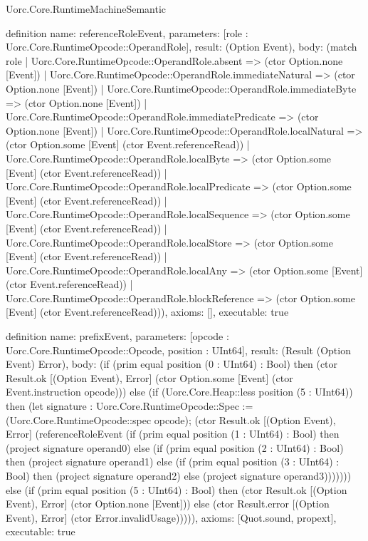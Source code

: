 \begin{lexlean}{Uorc.Core.RuntimeMachineSemantic}
\begin{semanticmodule}
definition{
  name: referenceRoleEvent,
  parameters: [role : Uorc.Core.RuntimeOpcode::OperandRole],
  result: (Option Event),
  body: (match role
    | Uorc.Core.RuntimeOpcode::OperandRole.absent => (ctor Option.none [Event])
    | Uorc.Core.RuntimeOpcode::OperandRole.immediateNatural => (ctor Option.none [Event])
    | Uorc.Core.RuntimeOpcode::OperandRole.immediateByte => (ctor Option.none [Event])
    | Uorc.Core.RuntimeOpcode::OperandRole.immediatePredicate => (ctor Option.none [Event])
    | Uorc.Core.RuntimeOpcode::OperandRole.localNatural => (ctor Option.some [Event] (ctor Event.referenceRead))
    | Uorc.Core.RuntimeOpcode::OperandRole.localByte => (ctor Option.some [Event] (ctor Event.referenceRead))
    | Uorc.Core.RuntimeOpcode::OperandRole.localPredicate => (ctor Option.some [Event] (ctor Event.referenceRead))
    | Uorc.Core.RuntimeOpcode::OperandRole.localSequence => (ctor Option.some [Event] (ctor Event.referenceRead))
    | Uorc.Core.RuntimeOpcode::OperandRole.localStore => (ctor Option.some [Event] (ctor Event.referenceRead))
    | Uorc.Core.RuntimeOpcode::OperandRole.localAny => (ctor Option.some [Event] (ctor Event.referenceRead))
    | Uorc.Core.RuntimeOpcode::OperandRole.blockReference => (ctor Option.some [Event] (ctor Event.referenceRead))),
  axioms: [],
  executable: true
}

definition{
  name: prefixEvent,
  parameters: [opcode : Uorc.Core.RuntimeOpcode::Opcode, position : UInt64],
  result: (Result (Option Event) Error),
  body: (if (prim equal position (0 : UInt64) : Bool) then (ctor Result.ok [(Option Event), Error] (ctor Option.some [Event] (ctor Event.instruction opcode))) else (if (Uorc.Core.Heap::less position (5 : UInt64)) then (let signature : Uorc.Core.RuntimeOpcode::Spec := (Uorc.Core.RuntimeOpcode::spec opcode); (ctor Result.ok [(Option Event), Error] (referenceRoleEvent (if (prim equal position (1 : UInt64) : Bool) then (project signature operand0) else (if (prim equal position (2 : UInt64) : Bool) then (project signature operand1) else (if (prim equal position (3 : UInt64) : Bool) then (project signature operand2) else (project signature operand3))))))) else (if (prim equal position (5 : UInt64) : Bool) then (ctor Result.ok [(Option Event), Error] (ctor Option.none [Event])) else (ctor Result.error [(Option Event), Error] (ctor Error.invalidUsage))))),
  axioms: [Quot.sound, propext],
  executable: true
}


\end{semanticmodule}
\end{lexlean}
